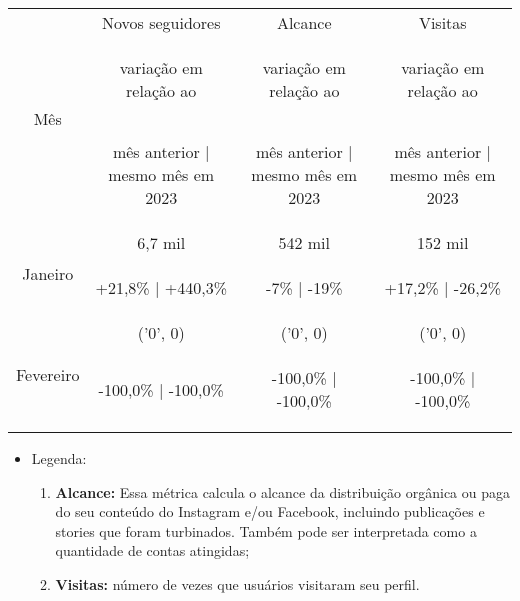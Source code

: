 \documentclass{article}%
\begin{document}
\begin{minipage}{\textwidth}%
\centering%
\begin{tabular}{@{}|c|c|c|c|@{}}%
\toprule%
\multirow{3}{*}{Mês}&Novos seguidores&Alcance&Visitas\\%
&\begin{footnotesize}%
variação em relação ao%
\end{footnotesize}&\begin{footnotesize}%
variação em relação ao%
\end{footnotesize}&\begin{footnotesize}%
variação em relação ao%
\end{footnotesize}\\%
&\begin{footnotesize}%
mês anterior | mesmo mês em 2023%
\end{footnotesize}&\begin{footnotesize}%
mês anterior | mesmo mês em 2023%
\end{footnotesize}&\begin{footnotesize}%
mês anterior | mesmo mês em 2023%
\end{footnotesize}\\%
\midrule%
\multirow{2}{*}{Janeiro}&6,7 mil&542 mil&152 mil\\%
&\begin{footnotesize}%
+21,8\% | +440,3\%%
\end{footnotesize}&\begin{footnotesize}%
{-}7\% | {-}19\%%
\end{footnotesize}&\begin{footnotesize}%
+17,2\% | {-}26,2\%%
\end{footnotesize}\\%
\midrule%
\multirow{2}{*}{Fevereiro}&('0', 0) &('0', 0) &('0', 0) \\%
&\begin{footnotesize}%
{-}100,0\% | {-}100,0\%%
\end{footnotesize}&\begin{footnotesize}%
{-}100,0\% | {-}100,0\%%
\end{footnotesize}&\begin{footnotesize}%
{-}100,0\% | {-}100,0\%%
\end{footnotesize}\\\bottomrule%
%
\end{tabular}%
\end{minipage}%
\begin{itemize}%
\item%
Legenda:%
\begin{enumerate}[label=-]%
\item%
\textbf{Alcance:} Essa métrica calcula o alcance da distribuição orgânica ou paga do seu conteúdo do Instagram e/ou Facebook, incluindo publicações e stories que foram turbinados. Também pode ser interpretada como a quantidade de contas atingidas;%
\item%
\textbf{Visitas:} número de vezes que usuários visitaram seu perfil.%
\end{enumerate}%
\end{itemize}
\end{document}
